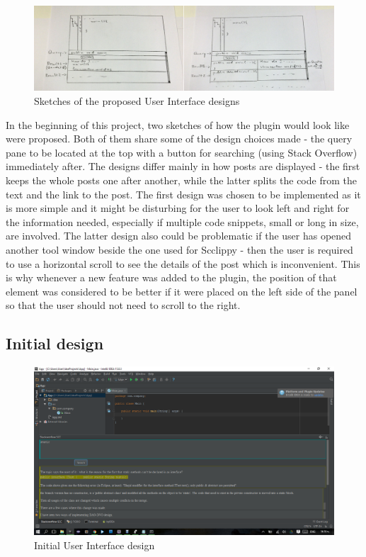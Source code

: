 \documentclass{l4proj}
\begin{document}
\begin{figure}[H]
\includegraphics[scale=0.2]{sketches}
\centering
\caption{Sketches of the proposed User Interface designs}\label{sketches}
\label{fig:sketches}
\end{figure}

In the beginning of this project, two sketches of how the plugin would look like were proposed. Both of them share some of the design choices made - the query pane to be located at the top with a button for searching (using Stack Overflow) immediately after. The designs differ mainly in how posts are displayed - the first keeps the whole posts one after another, while the latter splits the code from the text and the link to the post. The first design was chosen to be implemented as it is more simple and it might be disturbing for the user to look left and right for the information needed, especially if multiple code snippets, small or long in size, are involved. The latter design also could be problematic if the user has opened another tool window beside the one used for Scclippy - then the user is required to use a horizontal scroll to see the details of the post which is inconvenient. This is why whenever a new feature was added to the plugin, the position of that element was considered to be better if it were placed on the left side of the panel so that the user should not need to scroll to the right.

\subsection{Initial design}
\begin{figure}[H]
\includegraphics[scale=0.5]{ui-old}
\centering
\caption{Initial User Interface design}\label{ui-old}
\label{fig:ui-old}
\end{figure}
\end{document}
